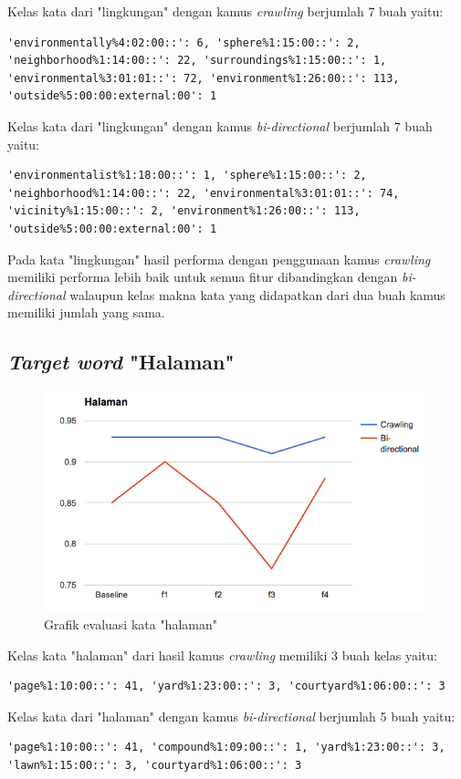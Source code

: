 Kelas kata dari "lingkungan" dengan kamus \textit{crawling} berjumlah 7 buah yaitu:
\begin{lstlisting}
'environmentally%4:02:00::': 6, 'sphere%1:15:00::': 2, 'neighborhood%1:14:00::': 22, 'surroundings%1:15:00::': 1, 'environmental%3:01:01::': 72, 'environment%1:26:00::': 113, 'outside%5:00:00:external:00': 1
\end{lstlisting}
Kelas kata dari "lingkungan" dengan kamus \textit{bi-directional} berjumlah 7 buah yaitu:
\begin{lstlisting}
'environmentalist%1:18:00::': 1, 'sphere%1:15:00::': 2, 'neighborhood%1:14:00::': 22, 'environmental%3:01:01::': 74, 'vicinity%1:15:00::': 2, 'environment%1:26:00::': 113, 'outside%5:00:00:external:00': 1
\end{lstlisting}


Pada kata "lingkungan" hasil performa dengan penggunaan kamus \textit{crawling} memiliki performa lebih baik untuk semua fitur dibandingkan dengan \textit{bi-directional} walaupun kelas makna kata yang didapatkan dari dua buah kamus memiliki jumlah yang sama.

\subsection{\textit{Target word} "Halaman"}

\begin{figure}
	\centering
	\includegraphics[width=1\linewidth]{adit_pics/halaman.png}
	\caption{Grafik evaluasi kata "halaman"}
	\label{fig:halaman}
\end{figure}

Kelas kata "halaman" dari hasil kamus \textit{crawling} memiliki 3 buah kelas yaitu:
\begin{lstlisting}
'page%1:10:00::': 41, 'yard%1:23:00::': 3, 'courtyard%1:06:00::': 3
\end{lstlisting}
Kelas kata dari "halaman" dengan kamus \textit{bi-directional} berjumlah 5 buah yaitu:
\begin{lstlisting}
'page%1:10:00::': 41, 'compound%1:09:00::': 1, 'yard%1:23:00::': 3, 'lawn%1:15:00::': 3, 'courtyard%1:06:00::': 3
\end{lstlisting}

